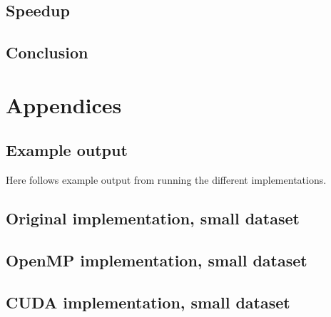 \documentclass[11pt]{article}
\begin{document}
\subsection{Speedup}
\begin{table}[h]
\centering
{}
\caption{Speedup comparison of the original implementation, the OpenMP implementation and the CUDA implementation}
\label{table:cudatime}
\end{table}
\subsection{Conclusion}

\newpage
\section{Appendices}
\subsection{Example output}
Here follows example output from running the different implementations.

\subsection{Original implementation, small dataset}

\subsection{OpenMP implementation, small dataset}

\subsection{CUDA implementation, small dataset}

\end{document}
